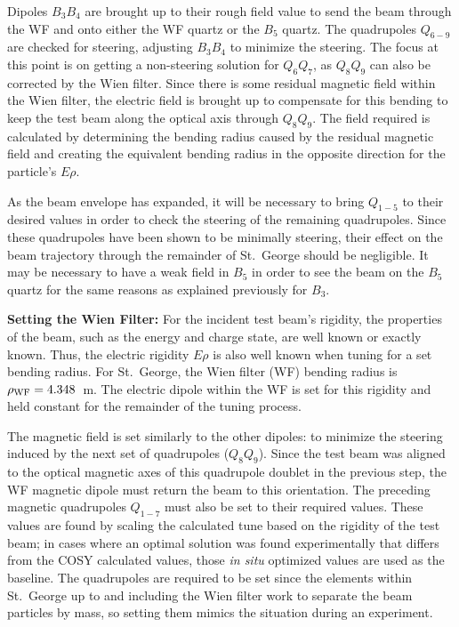 Dipoles $B_3B_4$ are brought up to their rough field value to send the
beam through the WF and onto either the WF quartz or the $B_5$ quartz.
The quadrupoles $Q_{6-9}$ are checked for steering, adjusting $B_3B_4$
to minimize the steering. The focus at this point is on getting a
non-steering solution for $Q_6Q_7$, as $Q_8Q_9$ can also be corrected by
the Wien filter. Since there is some residual magnetic field within the
Wien filter, the electric field is brought up to compensate for this
bending to keep the test beam along the optical axis through $Q_8Q_9$.
The field required is calculated by determining the bending radius
caused by the residual magnetic field and creating the equivalent
bending radius in the opposite direction for the particle's $E\rho$.

As the beam envelope has expanded, it will be necessary to bring
$Q_{1-5}$ to their desired values in order to check the steering of the
remaining quadrupoles. Since these quadrupoles have been shown to be
minimally steering, their effect on the beam trajectory through the
remainder of St.\ George should be negligible. It may be necessary to
have a weak field in $B_5$ in order to see the beam on the $B_5$ quartz
for the same reasons as explained previously for $B_3$.

\textbf{Setting the Wien Filter:}
For the incident test beam's rigidity, the properties of the beam, such
as the energy and charge state, are well known or exactly known. Thus,
the electric rigidity $E\rho$ is also well known when tuning for a set
bending radius. For St.\ George, the Wien filter (WF) bending radius is
$\rho_{\rm WF} = 4.348$~m. The electric dipole within the WF is set for
this rigidity and held constant for the remainder of the tuning process.

The magnetic field is set similarly to the other dipoles: to minimize
the steering induced by the next set of quadrupoles ($Q_8Q_9$). Since
the test beam was aligned to the optical magnetic axes of this
quadrupole doublet in the previous step, the WF magnetic dipole must
return the beam to this orientation. The preceding magnetic quadrupoles
$Q_{1-7}$ must also be set to their required values. These values are
found by scaling the calculated tune based on the rigidity of the test
beam; in cases where an optimal solution was found experimentally that
differs from the COSY calculated values, those \emph{in situ} optimized
values are used as the baseline. The quadrupoles are required to be set
since the elements within St.\ George up to and including the Wien filter
work to separate the beam particles by mass, so setting them mimics the
situation during an experiment.

